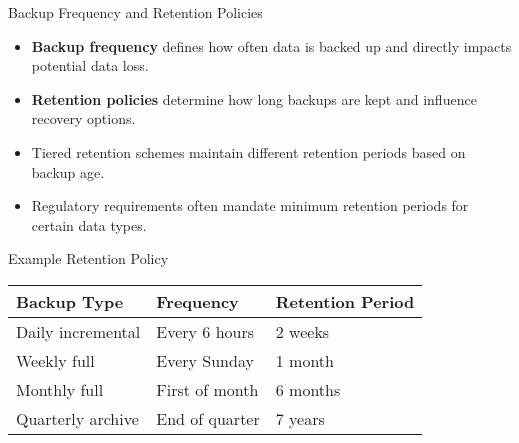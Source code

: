 \documentclass{beamer}
\begin{document}
\begin{frame}{Backup Frequency and Retention Policies}
    \begin{itemize}
        \item \textbf{Backup frequency} defines how often data is backed up and directly impacts potential data loss.
        \item \textbf{Retention policies} determine how long backups are kept and influence recovery options.
        \item Tiered retention schemes maintain different retention periods based on backup age.
        \item Regulatory requirements often mandate minimum retention periods for certain data types.
    \end{itemize}
    
    \begin{exampleblock}{Example Retention Policy}
        \scriptsize
        \begin{tabular}{p{3cm}p{3cm}p{4cm}}
            \textbf{Backup Type} & \textbf{Frequency} & \textbf{Retention Period} \\
            \hline
            Daily incremental & Every 6 hours & 2 weeks \\
            Weekly full & Every Sunday & 1 month \\
            Monthly full & First of month & 6 months \\
            Quarterly archive & End of quarter & 7 years \\
        \end{tabular}
    \end{exampleblock}
\end{frame}
\end{document}
